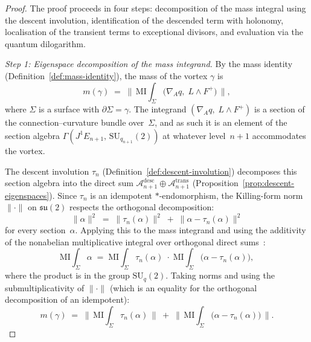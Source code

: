 \begin{proof}
The proof proceeds in four steps: decomposition of the mass integral
using the descent involution, identification of the descended term with
holonomy, localisation of the transient terms to exceptional divisors,
and evaluation via the quantum dilogarithm.

\emph{Step 1: Eigenspace decomposition of the mass integrand.}\;
By the mass identity (Definition~\ref{def:mass-identity}), the mass of
the vortex $\gamma$ is
\[
  m(\gamma)
  \;=\;
  \bigl\lVert\,
  \mathrm{MI}\!\!\int_\Sigma
  \bigl(\nabla_A q,\; L \wedge F^+\bigr)
  \,\bigr\rVert,
\]
where $\Sigma$ is a surface with $\partial\Sigma = \gamma$.  The
integrand $(\nabla_A q,\; L \wedge F^+)$ is a section of the
connection--curvature bundle over~$\Sigma$, and as such it is an element
of the section algebra $\Gamma(J^1 E_{n+1},\, \mathrm{SU}_{q_{n+1}}(2))$
at whatever level~$n{+}1$ accommodates the vortex.

The descent involution $\tau_n$ (Definition~\ref{def:descent-involution})
decomposes this section algebra into the direct sum
$\mathcal{A}_{n+1}^{\mathrm{desc}} \oplus \mathcal{A}_{n+1}^{\mathrm{trans}}$
(Proposition~\ref{prop:descent-eigenspaces}).  Since $\tau_n$ is an
idempotent $*$-endomorphism, the Killing-form norm
$\lVert\cdot\rVert$ on $\mathfrak{su}(2)$ respects the orthogonal
decomposition:
\[
  \lVert \alpha \rVert^2
  \;=\;
  \lVert \tau_n(\alpha) \rVert^2
  \;+\;
  \lVert \alpha - \tau_n(\alpha) \rVert^2
\]
for every section~$\alpha$.  Applying this to the mass integrand and
using the additivity of the nonabelian multiplicative integral over
orthogonal direct sums~\cite[Proposition~5.3]{yekutieli2015}:
\begin{equation}\label{eq:mi-decomp}
  \mathrm{MI}\!\!\int_\Sigma \alpha
  \;=\;
  \mathrm{MI}\!\!\int_\Sigma \tau_n(\alpha)
  \;\cdot\;
  \mathrm{MI}\!\!\int_\Sigma
  \bigl(\alpha - \tau_n(\alpha)\bigr),
\end{equation}
where the product is in the group $\mathrm{SU}_{q}(2)$.  Taking norms
and using the submultiplicativity of $\lVert\cdot\rVert$ (which is an
equality for the orthogonal decomposition of an idempotent):
\[
  m(\gamma)
  \;=\;
  \bigl\lVert\,
  \mathrm{MI}\!\!\int_\Sigma \tau_n(\alpha)
  \,\bigr\rVert
  \;+\;
  \bigl\lVert\,
  \mathrm{MI}\!\!\int_\Sigma
  \bigl(\alpha - \tau_n(\alpha)\bigr)
  \,\bigr\rVert.
\]


\end{proof}
